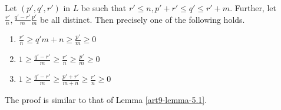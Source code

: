 \begin{lemma}\label{art9-lemma-5.4}
Let $(p',q',r')$ in $L$ be such that $r' \leq n, p' + r' \leq q' \leq r' +m$.
Further, let $\frac{r'}{n}, \frac{q'-r'}{m} \frac{p'}{m}$ be all distinct. Then precisely one of the following holds.
\begin{enumerate}[(1)]
\item $\frac{r'}{n} \geq {q'}{m+n} \geq \frac{p'}{m} \geq 0$\label{art9-lemma5.4-enum-1}

\item $1 \geq \frac{q'-r'}{m} \geq \frac{r'}{n} \geq \frac{p'}{m} \geq 0$\label{art9-lemma5.4-enum-2}

\item $1 \geq \frac{q'-r'}{m} \geq \frac{p'+r'}{m+n} \geq \frac{r'}{n} \geq 0$\label{art9-lemma5.4-enum-3}
\end{enumerate}
\end{lemma}
The proof is similar to that of Lemma \ref{art9-lemma-5.1}.

\setcounter{subsection}{4}

